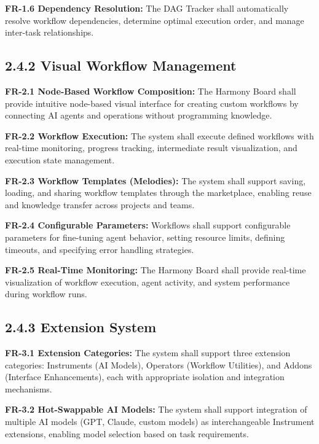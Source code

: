 \textbf{FR-1.6 Dependency Resolution:}
The DAG Tracker shall automatically resolve workflow dependencies, determine optimal execution order, and manage inter-task relationships.

\subsection*{2.4.2 Visual Workflow Management}
\label{sec:fr-workflow}

\textbf{FR-2.1 Node-Based Workflow Composition:}
The Harmony Board shall provide intuitive node-based visual interface for creating custom workflows by connecting AI agents and operations without programming knowledge.

\textbf{FR-2.2 Workflow Execution:}
The system shall execute defined workflows with real-time monitoring, progress tracking, intermediate result visualization, and execution state management.

\textbf{FR-2.3 Workflow Templates (Melodies):}
The system shall support saving, loading, and sharing workflow templates through the marketplace, enabling reuse and knowledge transfer across projects and teams.

\textbf{FR-2.4 Configurable Parameters:}
Workflows shall support configurable parameters for fine-tuning agent behavior, setting resource limits, defining timeouts, and specifying error handling strategies.

\textbf{FR-2.5 Real-Time Monitoring:}
The Harmony Board shall provide real-time visualization of workflow execution, agent activity, and system performance during workflow runs.

\subsection*{2.4.3 Extension System}
\label{sec:fr-extensions}

\textbf{FR-3.1 Extension Categories:}
The system shall support three extension categories: Instruments (AI Models), Operators (Workflow Utilities), and Addons (Interface Enhancements), each with appropriate isolation and integration mechanisms.

\textbf{FR-3.2 Hot-Swappable AI Models:}
The system shall support integration of multiple AI models (GPT, Claude, custom models) as interchangeable Instrument extensions, enabling model selection based on task requirements.

